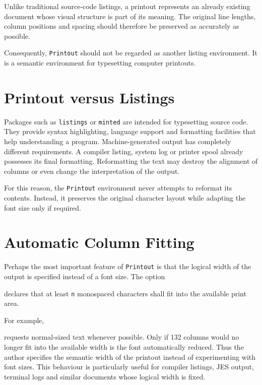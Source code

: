 \documentclass[
11pt,
a4paper,
oneside
]{scrbook}
\begin{document}
Unlike traditional source-code listings, a printout represents an
already existing document whose visual structure is part of its meaning.
The original line lengths, column positions and spacing should therefore
be preserved as accurately as possible.

Consequently, \texttt{Printout} should not be regarded as another
listing environment. It is a semantic environment for typesetting
computer printouts.

\section{Printout versus Listings}

Packages such as \texttt{listings} or \texttt{minted} are intended for
typesetting source code. They provide syntax highlighting, language
support and formatting facilities that help understanding a program.
Machine-generated output has completely different requirements.
A compiler listing, system log or printer spool already possesses its
final formatting. Reformatting the text may destroy the alignment of
columns or even change the interpretation of the output.

For this reason, the \texttt{Printout} environment never attempts to
reformat its contents. Instead, it preserves the original character
layout while adapting the font size only if required.

\section{Automatic Column Fitting}

Perhaps the most important feature of \texttt{Printout} is that the
logical width of the output is specified instead of a font size.
The option




declares that at least \texttt{n} monospaced characters shall fit into
the available print area.

\noindent For example,




requests normal-sized text whenever possible.
Only if 132 columns would no longer fit into the available width is the
font automatically reduced.
Thus the author specifies the semantic width of the printout instead of
experimenting with font sizes.
This behaviour is particularly useful for compiler listings, JES output,
terminal logs and similar documents whose logical width is fixed.
\end{document}
